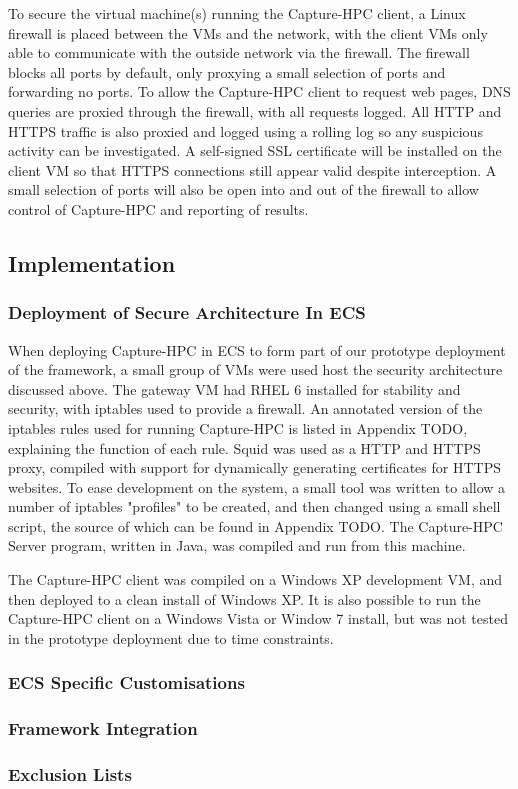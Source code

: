 To secure the virtual machine(s) running the Capture-HPC client, a Linux
firewall is placed between the VMs and the network, with the client VMs only
able to communicate with the outside network via the firewall. The firewall
blocks all ports by default, only proxying a small selection of ports and
forwarding no ports. To allow the Capture-HPC client to request web pages, DNS
queries are proxied through the firewall, with all requests logged. All HTTP and
HTTPS traffic is also proxied and logged using a rolling log so any suspicious
activity can be investigated. A self-signed SSL certificate will be installed on
the client VM so that HTTPS connections still appear valid despite interception.
A small selection of ports will also be open into and out of the firewall to
allow control of Capture-HPC and reporting of results.

\subsection{Implementation}

\subsubsection{Deployment of Secure Architecture In ECS}

When deploying Capture-HPC in ECS to form part of our prototype deployment of
the framework, a small group of VMs were used host the security architecture
discussed above. The gateway VM had RHEL 6 installed for stability and security,
with iptables used to provide a firewall. An annotated version of the iptables
rules used for running Capture-HPC is listed in Appendix TODO, explaining the
function of each rule. Squid was used as a HTTP and HTTPS proxy, compiled with
support for dynamically generating certificates for HTTPS websites. To ease 
development on the system, a small tool was written to allow a number of
iptables "profiles" to be created, and then changed using a small shell script,
the source of which can be found in Appendix TODO. The Capture-HPC Server
program, written in Java, was compiled and run from this machine.

The Capture-HPC client was compiled on a Windows XP development VM, and then
deployed to a clean install of Windows XP. It is also possible to run the
Capture-HPC client on a Windows Vista or Window 7 install, but was not tested in
the prototype deployment due to time constraints.

\subsubsection{ECS Specific Customisations}

\subsubsection{Framework Integration}

\subsubsection{Exclusion Lists}

